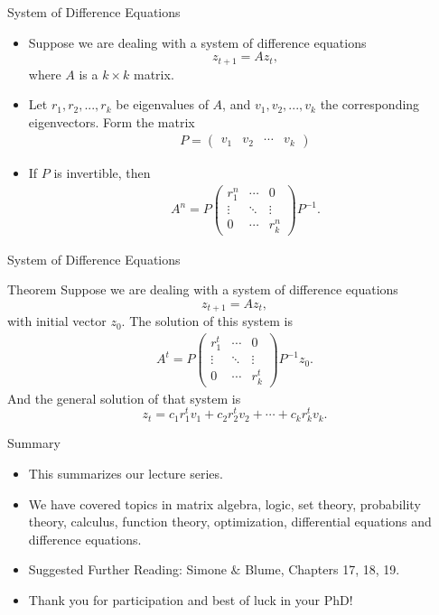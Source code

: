 \documentclass{beamer}
\begin{document}
\begin{frame}{System of Difference Equations}
\begin{itemize}
    \item Suppose we are dealing with a system of difference equations
    \[ z_{t+1}=Az_{t}, 
    \]
    where $A$ is a $k\times k$ matrix. 
    \item Let $r_1, r_2,..., r_k$ be eigenvalues of $A$, and $v_1,v_2,..., v_k$ the corresponding eigenvectors. Form the matrix
    \begin{align*}
        P=\begin{pmatrix}v_1 & v_2&\cdots & v_k
        \end{pmatrix}
    \end{align*}
    \item If $P$ is invertible, then 
    \begin{align*}
        A^n=P\begin{pmatrix}r_1^n & \cdots & 0\\
        \vdots & \ddots & \vdots \\
        0 &\cdots & r_k^n
        \end{pmatrix}P^{-1}.
    \end{align*}
    \end{itemize}
    \end{frame}

\begin{frame}{System of Difference Equations}
\begin{block}{Theorem}
      Suppose we are dealing with a system of difference equations
    \[ z_{t+1}=Az_{t}, 
    \]
    with initial vector $z_0. $ The solution of this system is 
     \begin{align*}
        A^t=P\begin{pmatrix}r_1^t & \cdots & 0\\
        \vdots & \ddots & \vdots \\
        0 &\cdots & r_k^t
        \end{pmatrix}P^{-1}z_0.
    \end{align*}
    And the general solution of that system is 
    \[z_t=c_1r_1^tv_1+c_2r_2^tv_2+\cdots +c_kr_k^tv_k.
    \]
\end{block}
    
\end{frame}

\begin{frame}{Summary}
\begin{itemize}
    \item This summarizes our lecture series. 
    \item We have covered topics in matrix algebra, logic, set theory, probability theory, calculus, function theory, optimization, differential equations and difference equations. \item Suggested Further Reading: Simone $\&$ Blume, Chapters 17, 18, 19. 
    \item Thank you for participation and best of luck in your PhD!
    
\end{itemize}
    
\end{frame}
\end{document}
